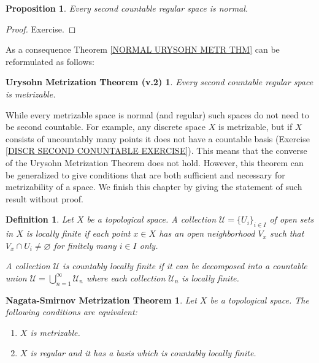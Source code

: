 \documentclass[11pt, letterpaper, oneside]{report}
\theoremstyle{pplain}
\newtheorem{proposition}[theorem]{Proposition}
\newtheorem{ITERMVALUE THM}[theorem]{Intermediate Value Theorem}
\newtheorem{HEINEBOREL THM}[theorem]{Heine-Borel Theorem}
\newtheorem{UMETR THM}[theorem]{Urysohn Metrization Theorem}
\newtheorem{UMETR2 THM}[theorem]{Urysohn Metrization Theorem (v.2)}
\newtheorem{NAGATASMIRNOVTHM}[theorem]{Nagata-Smirnov Metrization Theorem}
\theoremstyle{ddefinition}
\newtheorem{definition}[theorem]{Definition}
\theoremstyle{nnn}
\newtheorem{TDA NN}[theorem]{Topological Data Analysis. }
\theoremstyle{eexercise}
\begin{document}
\begin{proposition}
\label{REG COUNT BASIS IS NORMAL PROP}
Every second countable regular space is normal. 
\end{proposition}

\begin{proof}
Exercise.
\end{proof}

As a consequence  Theorem \ref{NORMAL URYSOHN METR THM}
can be reformulated as follows:


\begin{UMETR2 THM}
\label{REGULAR URYSOHN METR THM}
Every second countable regular space is metrizable. 
\end{UMETR2 THM}

While every metrizable space is normal (and regular) such spaces do not need to be second 
countable. For example, any discrete space $X$ is metrizable, but if $X$ consists of uncountably many 
points it does not have a countable basis (Exercise \ref{DISCR SECOND CONUNTABLE EXERCISE}). 
This means that the converse of the Urysohn Metrization Theorem 
does not hold. However, this theorem can be generalized to  give conditions that are both
sufficient and necessary for metrizability of a space. We finish this chapter by giving the statement 
of such result without proof. 

\begin{definition}
Let $X$ be a topological space. A collection $\mathcal{U} = \{U_{i}\}_{i\in I}$  of open sets in $X$
 is \emph{locally finite} if each point $x\in X$ has an open neighborhood $V_{x}$ such that 
$V_{x} \cap U_{i} \neq \varnothing$ for finitely many $i\in I$ only. 

A collection $\mathcal{U}$ is \emph{countably locally finite} if it can be decomposed into a 
countable union $\mathcal{U} = \bigcup_{n=1}^{\infty}\mathcal{U}_{n}$ where each collection 
$\mathcal{U}_{n}$ is locally finite. 
\end{definition}


\begin{NAGATASMIRNOVTHM}
\label{NAGATA-SMIRNOV THM}
Let $X$ be a topological space. The following conditions are equivalent:
\begin{enumerate}
\item $X$ is metrizable. 
\item $X$ is regular and it has a basis which is countably locally finite. 
\end{enumerate}
\end{NAGATASMIRNOVTHM}
 
\end{document}
